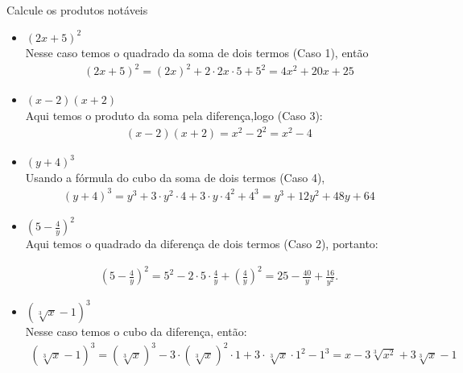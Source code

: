 \begin{exe} Calcule os produtos notáveis
\begin{itemize}
\item[a)] $(2x+5)^2$ \\
\color{red}
Nesse caso temos o quadrado da soma de dois termos (Caso 1), então
\begin{eqnarray*}
(2x+5)^2=(2x)^2+2\cdot2x\cdot5+5^2= 4x^2+20x+25
\end{eqnarray*}
\color{black}
\item[b)] $(x-2)(x+2)$ \\
\color{red}
Aqui temos o produto da soma pela diferença,logo (Caso 3):
\begin{eqnarray*}
(x-2)(x+2)=x^2-2^2=x^2-4
\end{eqnarray*}
\color{black}
\item[c)] $(y+4)^3$ \\
\color{red}
Usando a fórmula do cubo da soma de dois termos (Caso 4),
\begin{eqnarray*}
(y+4)^3= y^3+3\cdot y^2\cdot4+3\cdot y\cdot4^2+4^3 = y^3+12y^2+48y+64
\end{eqnarray*}
\color{black}
\item[d)] $(5-\frac{4}{y})^2$ \\
\color{red}
Aqui temos o quadrado da diferença de dois termos (Caso 2), portanto:

\begin{eqnarray*}
(5-\frac{4}{y})^2= 5^2-2\cdot5\cdot\frac{4}{y}+ \left(\frac{4}{y} \right)^2= 25-\frac{40}{y}+\frac{16}{y^2}.
\end{eqnarray*}
\color{black}
\item[e)] $(\sqrt[3]{x}-1)^3$ \\
\color{red}
Nesse caso temos o cubo da diferença, então:
\begin{eqnarray*}
(\sqrt[3]{x}-1)^3=(\sqrt[3]{x})^3-3\cdot(\sqrt[3]{x})^2 \cdot1+3\cdot \sqrt[3]{x}\cdot1^2-1^3=x-3\sqrt[3]{x^2}+ 3 \sqrt[3]{x}-1
\end{eqnarray*}
\color{black}
\end{itemize}
\end{exe}
